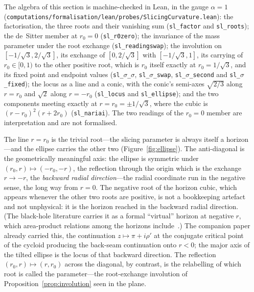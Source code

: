 \documentclass[11pt,a4paper]{article}
\theoremstyle{definition}
\begin{document}
The algebra of this section is machine-checked in Lean, in the gauge $\alpha=1$ (\texttt{computations/formalisation/lean/probes/SlicingCurvature.lean}): the factorisation, the three roots and their vanishing sum (\texttt{sl\_factor} and \texttt{sl\_roots}); the de~Sitter member at $r_{0}=0$ (\texttt{sl\_r0zero}); the invariance of the mass parameter under the root exchange (\texttt{sl\_readingswap}); the involution on $[-1/\sqrt3,2/\sqrt3]$, its exchange of $[0,2/\sqrt3]$ with $[-1/\sqrt3,1]$, its carrying of $r_{0}\in[0,1)$ to the other positive root, which is $r_{0}$ itself exactly at $r_{0}=1/\sqrt3$, and its fixed point and endpoint values (\texttt{sl\_$\sigma$\_$\sigma$}, \texttt{sl\_$\sigma$\_swap}, \texttt{sl\_$\sigma$\_second} and \texttt{sl\_$\sigma$\_fixed}); the locus as a line and a conic, with the conic's semi-axes $\sqrt{2/3}$ along $r=r_{0}$ and $\sqrt2$ along $r=-r_{0}$ (\texttt{sl\_locus} and \texttt{sl\_ellipse}); and the two components meeting exactly at $r=r_{0}=\pm1/\sqrt3$, where the cubic is $(r-r_{0})^{2}(r+2r_{0})$ (\texttt{sl\_nariai}). The two readings of the $r_{0}=0$ member are interpretation and are not formalised.

The line $r=r_{0}$ is the trivial root---the slicing parameter is always itself a horizon---and the ellipse carries the other two (Figure~\ref{fig:ellipse}). The anti-diagonal is the geometrically meaningful axis: the ellipse is symmetric under $(r_{0},r)\mapsto(-r_{0},-r)$, the reflection through the origin which is the exchange $r\to-r$, the \emph{backward radial direction}---the radial coordinate run in the negative sense, the long way from $r=0$. The negative root of the horizon cubic, which appears whenever the other two roots are positive, is not a bookkeeping artefact and not unphysical: it is the horizon reached in the backward radial direction. (The black-hole literature carries it as a formal ``virtual'' horizon at negative $r$, which area-product relations among the horizons include~\cite{Visser2013}.) The companion paper already carried this, the continuation $z\mapsto\pi+i\rho'$ at the conjugate critical point of the cycloid producing the back-seam continuation onto $r<0$; the major axis of the tilted ellipse is the locus of that backward direction. The reflection $(r_{0},r)\mapsto(r,r_{0})$ across the diagonal, by contrast, is the relabelling of which root is called the parameter---the root-exchange involution of Proposition~\ref{prop:involution} seen in the plane.
\end{document}
